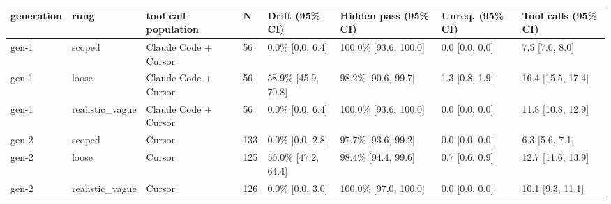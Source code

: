 \begin{tabular}{llllllll}
\toprule
generation & rung & tool call population & N & Drift (95\% CI) & Hidden pass (95\% CI) & Unreq. (95\% CI) & Tool calls (95\% CI) \\
\midrule
gen-1 & scoped & Claude Code + Cursor & 56 & 0.0\% [0.0, 6.4] & 100.0\% [93.6, 100.0] & 0.0 [0.0, 0.0] & 7.5 [7.0, 8.0] \\
gen-1 & loose & Claude Code + Cursor & 56 & 58.9\% [45.9, 70.8] & 98.2\% [90.6, 99.7] & 1.3 [0.8, 1.9] & 16.4 [15.5, 17.4] \\
gen-1 & realistic\_vague & Claude Code + Cursor & 56 & 0.0\% [0.0, 6.4] & 100.0\% [93.6, 100.0] & 0.0 [0.0, 0.0] & 11.8 [10.8, 12.9] \\
gen-2 & scoped & Cursor & 133 & 0.0\% [0.0, 2.8] & 97.7\% [93.6, 99.2] & 0.0 [0.0, 0.0] & 6.3 [5.6, 7.1] \\
gen-2 & loose & Cursor & 125 & 56.0\% [47.2, 64.4] & 98.4\% [94.4, 99.6] & 0.7 [0.6, 0.9] & 12.7 [11.6, 13.9] \\
gen-2 & realistic\_vague & Cursor & 126 & 0.0\% [0.0, 3.0] & 100.0\% [97.0, 100.0] & 0.0 [0.0, 0.0] & 10.1 [9.3, 11.1] \\
\bottomrule
\end{tabular}
